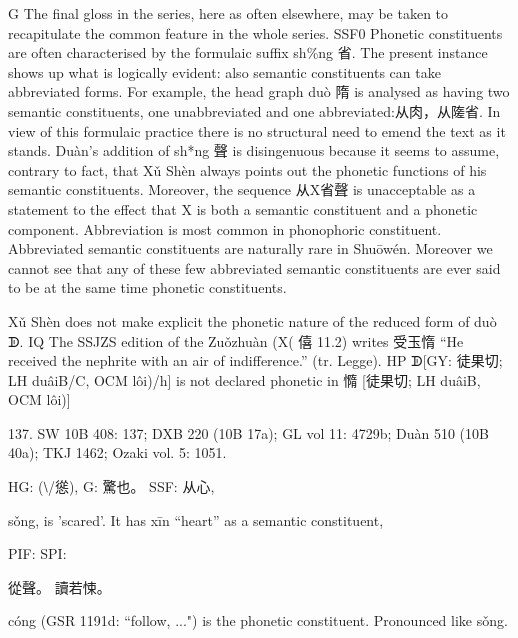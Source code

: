 G The final gloss in the series, here as often elsewhere, may be taken to recapitulate the common feature in the whole series.
SSF0 Phonetic constituents are often characterised by the formulaic suffix sh\%ng 省. The present instance shows up what is logically evident: also semantic constituents can take abbreviated forms. For example, the head graph duò 隋 is analysed as having two semantic constituents, one unabbreviated and one abbreviated:从肉，从隓省. In view of this formulaic practice there is no structural need to emend the text as it stands. Duàn's addition of sh*ng 聲 is disingenuous because it seems to assume, contrary to fact, that Xǔ Shèn always points out the phonetic functions of his semantic constituents. Moreover, the sequence 从X省聲 is unacceptable as a statement to the effect that X is both a semantic constituent and a phonetic component. Abbreviation is most common in phonophoric constituent. Abbreviated semantic constituents are naturally rare in Shuōwén. Moreover we cannot see that any of these few abbreviated semantic constituents are ever said to be at the same time phonetic constituents.




Xǔ Shèn does not make explicit the phonetic nature of the reduced form of duò ᗫ.
IQ	The SSJZS edition of the Zuǒzhuàn (X( 僖 11.2) writes 受玉惰 ``He received the nephrite with an air of indifference.'' (tr. Legge).
HP	ᗫ[GY: 徒果切; LH duâiB/C, OCM lôi)/h] is not declared phonetic in 憜 [徒果切; LH duâiB, OCM lôi)]


137. SW 10B 408: 137; DXB 220 (10B 17a); GL vol 11: 4729b; Duàn 510 (10B 40a); TKJ 1462; Ozaki vol. 5: 1051.


HG:  (⧵/慫),
G:	驚也。
SSF: 从心,

sǒng,
is 'scared'.
It has xīn ``heart'' as a semantic constituent,

PIF: SPI:

從聲。 讀若悚。

cóng (GSR 1191d: ``follow, ...") is the phonetic constituent. Pronounced like sǒng.

